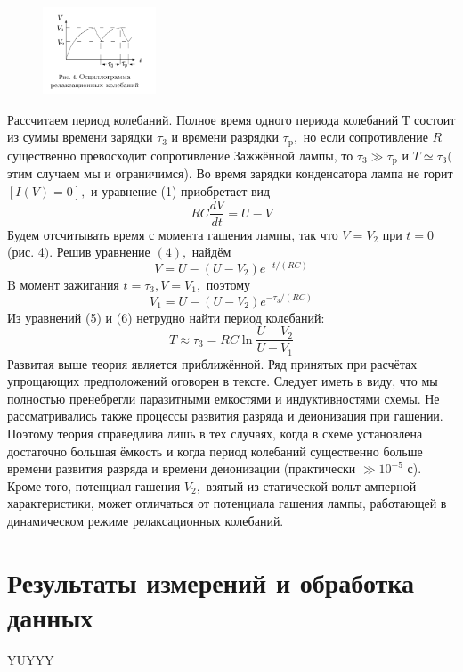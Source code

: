 \documentclass[a4paper, 12pt]{article}%
\begin{document}
\newpage

\begin{figure} 
\begin{center}
\includegraphics[width=0.3\textwidth]{./ann/4.PNG} 
\end{center}
\end{figure}

Рассчитаем период колебаний. Полное время одного периода колебаний Т состоит из суммы времени зарядки $\tau_{3}$ и времени разрядки $\tau_{\mathrm{p}},$ но если сопротивление $R$ существенно превосходит сопротивление Зажжённой лампы, то $\tau_{3} \gg \tau_{\mathrm{p}}$ и $T \simeq \tau_{3}($ этим случаем мы и ограничимся). Во время зарядки конденсатора лампа не горит $[I(V)=0],$ и уравнение (1) приобретает вид
$$
R C \frac{d V}{d t}=U-V
$$
Будем отсчитывать время с момента гашения лампы, так что $V=V_{2}$ при $t=0$ (рис. 4$) .$ Решив уравнение $(4),$ найдём
$$
V=U-\left(U-V_{2}\right) e^{-t /(R C)}
$$
$\mathrm{B}$ момент зажигания $t=\tau_{3}, V=V_{1},$ поэтому
$$
V_{1}=U-\left(U-V_{2}\right) e^{-\tau_{3} /(R C)}
$$
Из уравнений (5) и (6) нетрудно найти период колебаний:
$$
T \approx \tau_{3}=R C \ln \frac{U-V_{2}}{U-V_{1}}
$$
Развитая выше теория является приближённой. Ряд принятых при расчётах упрощающих предположений оговорен в тексте. Следует иметь в виду, что мы полностью пренебрегли паразитными емкостями и индуктивностями схемы. Не
рассматривались также процессы развития разряда и деионизация при гашении. Поэтому теория справедлива лишь в тех случаях, когда в схеме установлена достаточно большая ёмкость и когда период колебаний существенно больше времени развития разряда и времени деионизации (практически $\gg 10^{-5}$ с). Кроме того, потенциал гашения $V_{2},$ взятый из статической вольт-амперной характеристики, может отличаться от потенциала гашения лампы, работающей в динамическом режиме релаксационных колебаний.

\section{Результаты измерений и обработка данных}

YUYYY
\end{document}
